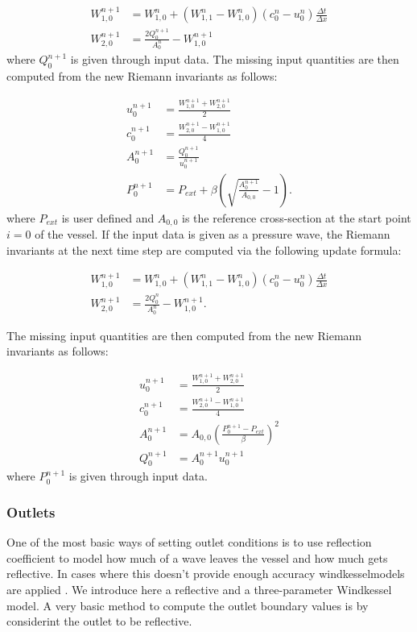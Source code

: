 \documentclass[a4paper, oneside]{discothesis}
\begin{document}
\begin{align}
	W_{1,0}^{n+1} &= W^n_{1,0} + (W^n_{1,1} - W^n_{1,0})(c^n_0-u^n_0) \frac{\Delta t}{\Delta x} \label{update1a}\\
	W_{2,0}^{n+1} &= \frac{2Q^{n+1}_0}{A^n_0} - W^{n+1}_{1,0} \label{update2a}
\end{align}
where $Q^{n+1}_0$ is given through input data.
The missing input quantities are then computed from the new Riemann invariants as follows:

\begin{align}
	u_0^{n+1} &= \frac{W_{1,0}^{n+1} + W_{2,0}^{n+1}}{2} \\
	c_0^{n+1} &= \frac{W_{2,0}^{n+1} - W_{1,0}^{n+1}}{4} \\
	A_0^{n+1} &= \frac{Q_0^{n+1}}{u_0^{n+1}} \\
	P_0^{n+1} &= P_{ext} + \beta \left( \sqrt{\frac{A_0^{n+1}}{A_{0,0}}} - 1 \right). 
\end{align}
where $P_{ext}$ is user defined and $A_{0,0}$ is the reference cross-section at the start point $i=0$ of the vessel.
If the input data is given as a pressure wave, the Riemann invariants at the next time step are computed via the following update formula:

\begin{align}
	W_{1,0}^{n+1} &= W^n_{1,0} + (W^n_{1,1} - W^n_{1,0})(c^n_0-u^n_0) \frac{\Delta t}{\Delta x} \label{update1b}\\
	W_{2,0}^{n+1} &= \frac{2Q^{n}_0}{A^n_0} - W^{n+1}_{1,0} \label{update2b}.
\end{align}

The missing input quantities are then computed from the new Riemann invariants as follows:

\begin{align}
	u_0^{n+1} &= \frac{W_{1,0}^{n+1} + W_{2,0}^{n+1}}{2} \\
	c_0^{n+1} &= \frac{W_{2,0}^{n+1} - W_{1,0}^{n+1}}{4} \\
	A_0^{n+1} &= A_{0,0}\left(\frac{P_0^{n+1}-P_{ext}}{\beta}\right)^2\\
	Q_0^{n+1} &= A_0^{n+1} u_0^{n+1}
\end{align}
where $P^{n+1}_0$ is given through input data.

\subsubsection{Outlets} \label{sssec:outl}
One of the most basic ways of setting outlet conditions is to use reflection coefficient to model how much of a wave leaves the vessel and how much gets reflective.
In cases where this doesn't provide enough accuracy windkesselmodels are applied \cite {formaggia2010cardiovascular}.
We introduce here a reflective and a three-parameter Windkessel model.
A very basic method to compute the outlet boundary values is by considerint the outlet to be reflective.
\end{document}
